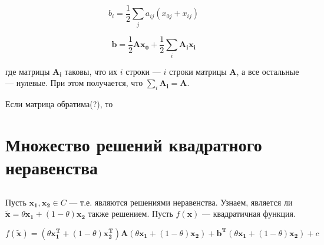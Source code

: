 	\begin{equation}
	 b_i = \frac 12 \sum\limits_{j} a_{ij} (x_{0j}+x_{ij}) 
	\end{equation}
	
	\begin{equation}
	\mathbf{b} = \frac 12 \mathbf{A} \mathbf{x_0} + \frac 12 \sum_i \mathbf{A_i} \mathbf{x_i}
	\end{equation}
	
	где матрицы $\mathbf{A_i}$ таковы, что их $i$ строки --- $i$ строки матрицы $\mathbf{A}$, а все остальные --- нулевые. При этом получается, что $\sum\limits_i \mathbf{A_i} = \mathbf{A}$.
	
	Если матрица обратима(?), то
	
	\subsection{}
	
	\subsection{}
	
	\section{Множество решений квадратного неравенства}
	
	\subsection{}
	
	Пусть $\mathbf{x_1}, \mathbf{x_2} \in C$ --- т.е. являются решениями неравенства. Узнаем, является ли $\mathbf{\tilde{x}} = \theta \mathbf{x_1} + (1-\theta)\mathbf{x_2}$ также решением. Пусть $f(\mathbf{x})$ --- квадратичная функция.
	
	\begin{equation}
	f(\mathbf{\tilde{x}}) = (\theta \mathbf{x_1^T} + (1-\theta)\mathbf{x_2^T}) \mathbf{A} (\theta \mathbf{x_1} + (1-\theta)\mathbf{x_2})+ \mathbf{b^T} (\theta \mathbf{x_1} + (1-\theta)\mathbf{x_2}) + c
	\end{equation}
	
